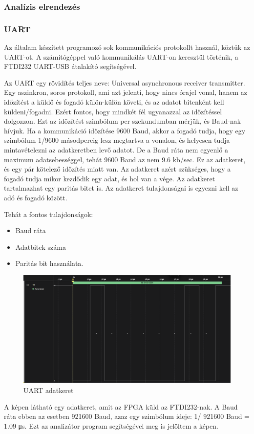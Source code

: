 \documentclass[a4paper,12pt,oneside]{book}
\begin{document}
\subsubsection{Analízis elrendezés}  
\subsubsection{UART}
Az általam készített programozó sok kommunikációs protokollt használ, köztük az UART-ot. A számítógéppel való kommunikálás UART-on keresztül történik, a FTDI232 UART-USB átalakító segítségével.

Az UART egy rövidítés teljes neve: Universal asynchronous receiver transmitter. Egy aszinkron, soros protokoll, ami azt jelenti, hogy nincs órajel vonal, hanem az időzítést a küldő és fogadó külön-külön követi, és az adatot bitenként kell küldeni/fogadni. Ezért fontos, hogy mindkét fél ugyanazzal az időzítéssel dolgozzon. Ezt az időzítést szimbólum per szekundumban mérjük, és Baud-nak hívjuk. Ha a kommunikáció időzítése 9600 Baud, akkor a fogadó tudja, hogy egy szimbólum 1/9600 másodpercig lesz megtartva a vonalon, és helyesen tudja mintavételezni az adatkeretben levő adatot. De a Baud ráta nem egyenlő a maximum adatsebességgel, tehát 9600 Baud az nem 9.6 kb/sec. Ez az adatkeret, és egy pár kötelező időzítés miatt van. Az adatkeret azért szükséges, hogy a fogadó tudja mikor kezdődik egy adat, és hol van a vége. Az adatkeret tartalmazhat egy paritás bitet is. Az adatkeret tulajdonságai is egyezni kell az adó és fogadó között.

Tehát a fontos tulajdonságok:
\begin{itemize}
	\item Baud ráta
	\item Adatbitek száma 
	\item Paritás bit használata.
\end{itemize}
\begin{figure}[H]
	\centering
	\includegraphics[trim=1mm 1mm 1mm 1mm,scale=0.35]{UARTfromAnalyzer.PNG}
	\caption{UART adatkeret}
	\label{UARTkep}
\end{figure}
A képen látható egy adatkeret, amit az FPGA küld az FTDI232-nak. A Baud ráta ebben az esetben 921600 Baud, azaz egy szimbólum ideje: 1/ 921600 Baud = 1.09 μs. Ezt az analizátor program segítségével meg is jelöltem a képen.
\end{document}
